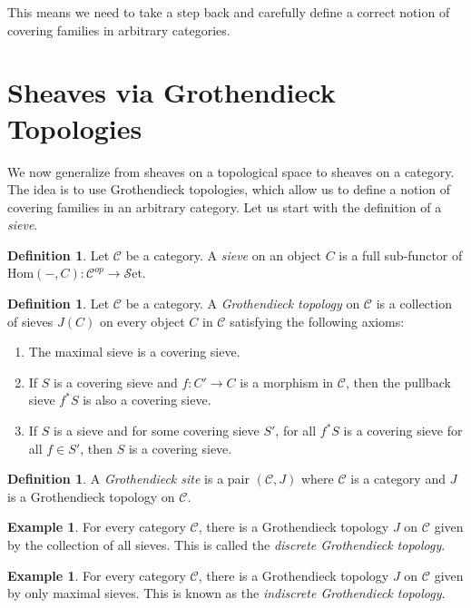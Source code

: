 \documentclass[10pt]{amsart}
\newcommand{\C}{\mathscr{C}}
\newcommand{\Hom}{\mathrm{Hom}}
\newcommand{\set}{\mathscr{S}\mathrm{et}}
\theoremstyle{definition}
\newtheorem{definition}[equation]{Definition}
\newtheorem{example}[equation]{Example}
\theoremstyle{remark}
\begin{document}
This means we need to take a step back and carefully define a correct notion of covering families in arbitrary categories.

\section{Sheaves via Grothendieck Topologies}
We now generalize from sheaves on a topological space to sheaves on a category. The idea is to use Grothendieck topologies, which allow us to define a notion of covering families in an arbitrary category. Let us start with the definition of a \emph{sieve}.

\begin{definition}
  Let $\C$ be a category. A \emph{sieve} on an object $C$ is a full sub-functor of $\Hom(-,C)\colon \C^{op} \to \set$.
\end{definition}

\begin{definition}
  Let $\C$ be a category. A \emph{Grothendieck topology} on $\C$ is a collection of sieves $J(C)$ on every object $C$ in $\C$ satisfying the following axioms:
  \begin{enumerate}
    \item The maximal sieve is a covering sieve.
    \item If $S$ is a covering sieve and $f\colon C' \to C$ is a morphism in $\C$, then the pullback sieve $f^*S$ is also a covering sieve.
    \item If $S$ is a sieve and for some covering sieve $S'$, for all $f^*S$ is a covering sieve for all $f \in S'$, then $S$ is a covering sieve.
  \end{enumerate}
\end{definition}

\begin{definition}
  A \emph{Grothendieck site} is a pair $(\C, J)$ where $\C$ is a category and $J$ is a Grothendieck topology on $\C$.
\end{definition}

\begin{example}
  For every category $\C$, there is a Grothendieck topology $J$ on $\C$ given by the collection of all sieves. This is called the \emph{discrete Grothendieck topology}.
\end{example}

\begin{example}
  For every category $\C$, there is a Grothendieck topology $J$ on $\C$ given by only maximal sieves. This is known as the \emph{indiscrete Grothendieck topology}.
\end{example}
\end{document}
